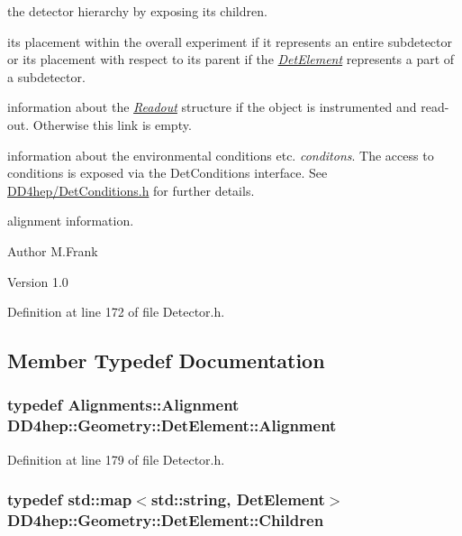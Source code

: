 \begin{DoxyItemize}
\item the detector hierarchy by exposing its children.
\item its placement within the overall experiment if it represents an entire subdetector or its placement with respect to its parent if the {\itshape \hyperlink{class_d_d4hep_1_1_geometry_1_1_det_element}{DetElement}\/} represents a part of a subdetector.
\item information about the {\itshape \hyperlink{class_d_d4hep_1_1_geometry_1_1_readout}{Readout}\/} structure if the object is instrumented and read-\/out. Otherwise this link is empty.
\item information about the environmental conditions etc. {\itshape conditons\/}. The access to conditions is exposed via the DetConditions interface. See \hyperlink{_det_conditions_8h}{DD4hep/DetConditions.h} for further details.
\item alignment information.
\end{DoxyItemize}\begin{DoxyAuthor}{Author}
M.Frank 
\end{DoxyAuthor}
\begin{DoxyVersion}{Version}
1.0 
\end{DoxyVersion}


Definition at line 172 of file Detector.h.

\subsection{Member Typedef Documentation}
\hypertarget{class_d_d4hep_1_1_geometry_1_1_det_element_a5e5bddb6f1ba24c21af381b9bfeb3dba}{
\subsubsection[{Alignment}]{\setlength{\rightskip}{0pt plus 5cm}typedef {\bf Alignments::Alignment} {\bf DD4hep::Geometry::DetElement::Alignment}}}
\label{class_d_d4hep_1_1_geometry_1_1_det_element_a5e5bddb6f1ba24c21af381b9bfeb3dba}


Definition at line 179 of file Detector.h.\hypertarget{class_d_d4hep_1_1_geometry_1_1_det_element_afc41f63ac2a467f5077d1cca1292d580}{
\subsubsection[{Children}]{\setlength{\rightskip}{0pt plus 5cm}typedef std::map$<$std::string, {\bf DetElement}$>$ {\bf DD4hep::Geometry::DetElement::Children}}}
\label{class_d_d4hep_1_1_geometry_1_1_det_element_afc41f63ac2a467f5077d1cca1292d580}



